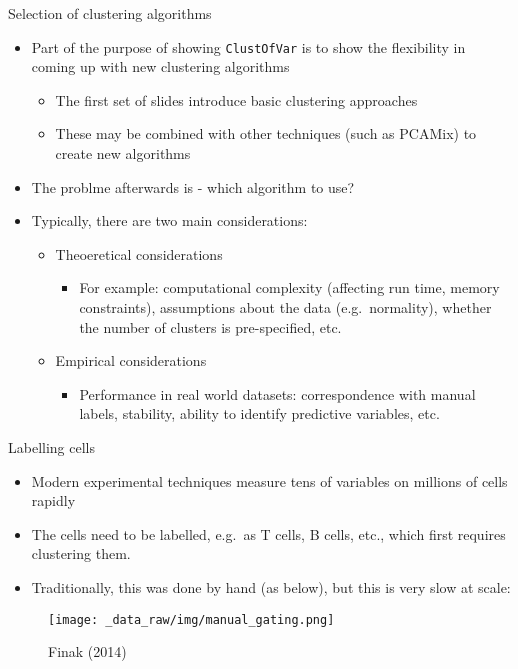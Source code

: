 \documentclass[
  ignorenonframetext,
  aspectratio=169,
]{beamer}
\providecommand{\tightlist}{%
  \setlength{\itemsep}{0pt}\setlength{\parskip}{0pt}}\usepackage{longtable,booktabs,array}
\begin{document}
\begin{frame}[fragile]{Selection of clustering algorithms}
\protect\hypertarget{selection-of-clustering-algorithms}{}
\begin{itemize}
\tightlist
\item
  Part of the purpose of showing \texttt{ClustOfVar} is to show the
  flexibility in coming up with new clustering algorithms

  \begin{itemize}
  \tightlist
  \item
    The first set of slides introduce basic clustering approaches
  \item
    These may be combined with other techniques (such as PCAMix) to
    create new algorithms
  \end{itemize}
\item
  The problme afterwards is - which algorithm to use?
\item
  Typically, there are two main considerations:

  \begin{itemize}
  \tightlist
  \item
    Theoeretical considerations

    \begin{itemize}
    \tightlist
    \item
      For example: computational complexity (affecting run time, memory
      constraints), assumptions about the data (e.g.~normality), whether
      the number of clusters is pre-specified, etc.
    \end{itemize}
  \item
    Empirical considerations

    \begin{itemize}
    \tightlist
    \item
      Performance in real world datasets: correspondence with manual
      labels, stability, ability to identify predictive variables, etc.
    \end{itemize}
  \end{itemize}
\end{itemize}
\end{frame}

\begin{frame}{Labelling cells}
\protect\hypertarget{labelling-cells}{}
\begin{itemize}
\tightlist
\item
  Modern experimental techniques measure tens of variables on millions
  of cells rapidly
\item
  The cells need to be labelled, e.g.~as T cells, B cells, etc., which
  first requires clustering them.
\item
  Traditionally, this was done by hand (as below), but this is very slow
  at scale:
\end{itemize}

\begin{figure}[H]
\centering
\texttt{[image: \_data\_raw/img/manual\_gating.png]}
\caption{Finak (2014)}
\end{figure}
\end{frame}
\end{document}
